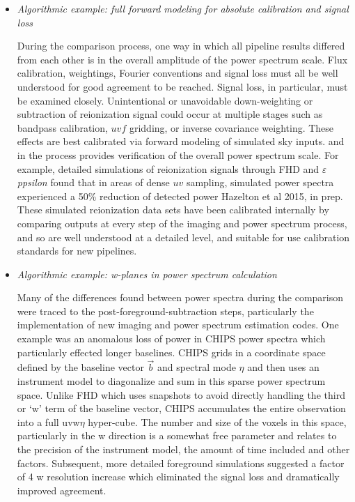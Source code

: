 \documentclass[twolcolumn,iop]{emulateapj}
\def\eppsilon{{\it $\varepsilon$ppsilon}}
\def\eppsiloncite{Hazelton et al 2015, in prep}
\begin{document}
\begin{itemize}
\item \emph{Algorithmic example: full forward modeling for absolute calibration and signal loss}

During the comparison process, one way in which all pipeline results differed from each other is in the overall amplitude of the power spectrum scale. Flux calibration, weightings, Fourier conventions and signal loss must all be well understood for good agreement to be reached.  Signal loss, in particular, must be examined closely. Unintentional or unavoidable down-weighting or subtraction of reionization signal could occur at multiple stages such as bandpass calibration, $uvf$ gridding, or inverse covariance weighting. These effects are best calibrated via forward modeling of simulated sky inputs. and in the process provides verification of the overall power spectrum scale.  For example, detailed simulations of reionization signals through FHD and \eppsilon{} found that in areas of dense $uv$ sampling, simulated power spectra experienced a 50\% reduction of detected power \eppsiloncite{}.  These simulated reionization data sets have been calibrated internally by comparing outputs at every step of the imaging and power spectrum process, and so are well understood at a detailed level, and suitable for use calibration standards for new pipelines.



\item \emph{Algorithmic example: w-planes in power spectrum calculation}


Many of the differences found between power spectra during the comparison were traced to the post-foreground-subtraction steps, particularly the implementation of new imaging and power spectrum estimation codes.  One example was an anomalous loss of power in CHIPS power spectra which particularly effected longer baselines.  CHIPS grids in a coordinate space defined by the baseline vector $\vec{b}$ and spectral mode $\eta$ and then uses an instrument model to diagonalize and sum in this sparse power spectrum space.  Unlike FHD which uses snapshots to avoid directly handling the third or `w' term of the baseline vector, CHIPS accumulates the entire observation into a full uvw$\eta$ hyper-cube.  The number and size of the voxels in this space, particularly in the w direction is a somewhat free parameter and relates to the precision of the instrument model, the amount of time included and other factors.  Subsequent, more detailed foreground simulations suggested a factor of 4 w resolution increase which eliminated the signal loss and dramatically improved agreement.



\end{itemize}
\end{document}
